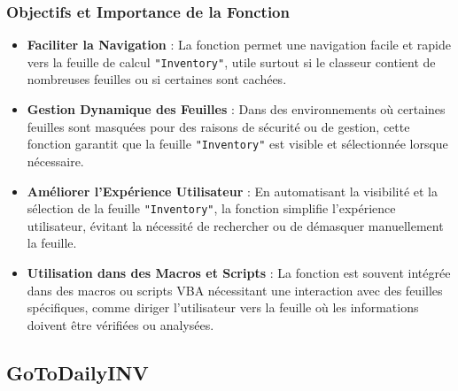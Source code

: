 \documentclass[a4paper, oneside, 12pt, final]{extreport}
\begin{document}
\subsubsection{Objectifs et Importance de la Fonction}
\begin{itemize}
    \item \textbf{Faciliter la Navigation} : La fonction permet une navigation facile et rapide vers la feuille de calcul \texttt{"Inventory"}, utile surtout si le classeur contient de nombreuses feuilles ou si certaines sont cachées.
    \item \textbf{Gestion Dynamique des Feuilles} : Dans des environnements où certaines feuilles sont masquées pour des raisons de sécurité ou de gestion, cette fonction garantit que la feuille \texttt{"Inventory"} est visible et sélectionnée lorsque nécessaire.
    \item \textbf{Améliorer l'Expérience Utilisateur} : En automatisant la visibilité et la sélection de la feuille \texttt{"Inventory"}, la fonction simplifie l'expérience utilisateur, évitant la nécessité de rechercher ou de démasquer manuellement la feuille.
    \item \textbf{Utilisation dans des Macros et Scripts} : La fonction est souvent intégrée dans des macros ou scripts VBA nécessitant une interaction avec des feuilles spécifiques, comme diriger l'utilisateur vers la feuille où les informations doivent être vérifiées ou analysées.
\end{itemize}
\subsection{GoToDailyINV}
\end{document}
